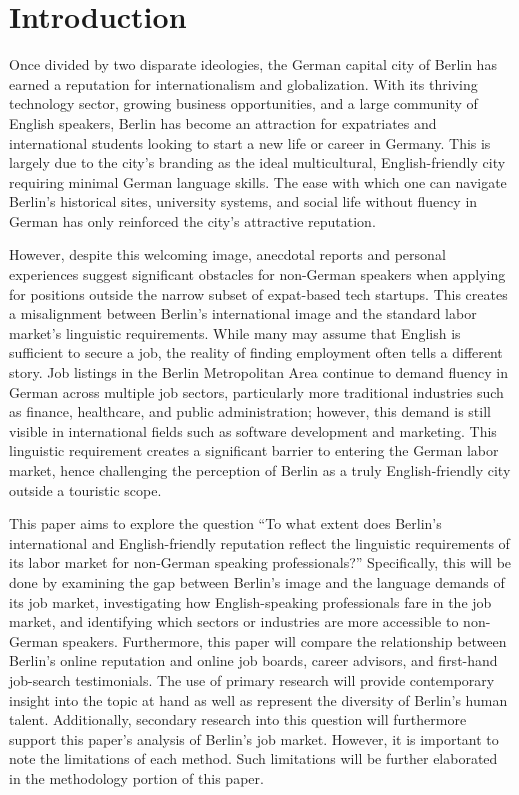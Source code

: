 \titlespacing*{\chapter}{0pt}{0pt}{0pt}

\chapter{Introduction}

Once divided by two disparate ideologies, the German capital city of Berlin has earned a reputation for internationalism and globalization. With its thriving technology sector, growing business opportunities, and a large community of English speakers, Berlin has become an attraction for expatriates and international students looking to start a new life or career in Germany. This is largely due to the city’s branding as the ideal multicultural, English-friendly city requiring minimal German language skills. The ease with which one can navigate Berlin’s historical sites, university systems, and social life without fluency in German has only reinforced the city’s attractive reputation. 

However, despite this welcoming image, anecdotal reports and personal experiences suggest significant obstacles for non-German speakers when applying for positions outside the narrow subset of expat-based tech startups. This creates a misalignment between Berlin’s international image and the standard labor market’s linguistic requirements. While many may assume that English is sufficient to secure a job, the reality of finding employment often tells a different story. Job listings in the Berlin Metropolitan Area continue to demand fluency in German across multiple job sectors, particularly more traditional industries such as finance, healthcare, and public administration; however, this demand is still visible in international fields such as software development and marketing. This linguistic requirement creates a significant barrier to entering the German labor market, hence challenging the perception of Berlin as a truly English-friendly city outside a touristic scope.

This paper aims to explore the question “To what extent does Berlin’s international and English-friendly reputation reflect the linguistic requirements of its labor market for non-German speaking professionals?” Specifically, this will be done by examining the gap between Berlin’s image and the language demands of its job market, investigating how English-speaking professionals fare in the job market, and identifying which sectors or industries are more accessible to non-German speakers.
Furthermore, this paper will compare the relationship between Berlin’s online reputation and online job boards, career advisors, and first-hand job-search testimonials. The use of primary research will provide contemporary insight into the topic at hand as well as represent the diversity of Berlin’s human talent. Additionally, secondary research into this question will furthermore support this paper’s analysis of Berlin’s job market. However, it is important to note the limitations of each method. Such limitations will be further elaborated in the methodology portion of this paper.

\titlespacing*{\chapter}{0pt}{12pt}{0pt}